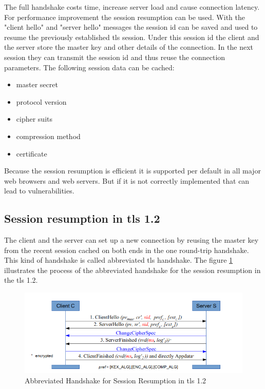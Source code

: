 The full handshake costs time, increase server load and cause connection latency. For performance improvement the session resumption can be used. With the "client hello" and "server hello" messages the session id can be saved and used to resume the previously established \gls{tls} session. Under this session id the client and the server store the master key and other details of the connection. In the next session they can transmit the session id and thus reuse the connection parameters. The following session data can be cached:
\begin{itemize}
\item master secret
\item protocol version
\item cipher suits
\item compression method
\item certificate
\end{itemize}
Because the session resumption is efficient it is supported per default in all major web browsers and web servers. But if it is not correctly implemented that can lead to vulnerabilities.

\subsection{Session resumption in \gls{tls} 1.2}
\label{subsec:resumption1_2}

The client and the server can set up a new connection by reusing the master key from the recent session cached on both ends in the one round-trip handshake. This kind of handshake is called abbreviated \gls{tls} handshake. The figure \ref{fig:resumption1_2} illustrates the process of the abbreviated handshake for the session resumption in the \gls{tls} 1.2.

\begin{figure}[H]
	\centering
		\includegraphics[scale=0.85]{images/resumption1_2.png}
	\caption{Abbreviated Handshake for Session Resumption in \gls{tls} 1.2 \cite{Hassenstein}}
	\label{fig:resumption1_2}
\end{figure}

